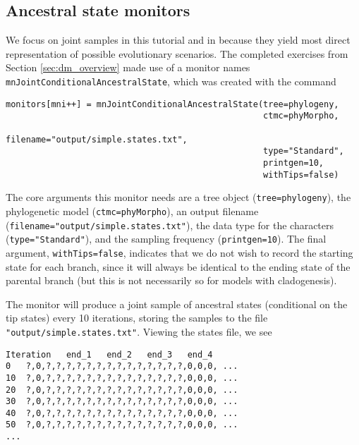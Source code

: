 \subsection{Ancestral state monitors}

We focus on joint samples in this tutorial and in \RevBayes because they yield most direct representation of possible evolutionary scenarios.
The completed exercises from Section \ref{sec:dm_overview} made use of a monitor names {\tt mnJointConditionalAncestralState}, which was created with the command

{\tt \begin{snugshade*}
\begin{lstlisting}
monitors[mni++] = mnJointConditionalAncestralState(tree=phylogeny,
                                                   ctmc=phyMorpho,
                                                   filename="output/simple.states.txt",
                                                   type="Standard",
                                                   printgen=10,
                                                   withTips=false)
\end{lstlisting}
\end{snugshade*}}

The core arguments this monitor needs are a tree object ({\tt tree=phylogeny}), the phylogenetic model ({\tt ctmc=phyMorpho}), an output filename ({\tt filename="output/simple.states.txt"}), the data type for the characters ({\tt type="Standard"}), and the sampling frequency ({\tt printgen=10}).
The final argument, {\tt withTips=false}, indicates that we do not wish to record the starting state for each branch, since it will always be identical to the ending state of the parental branch (but this is not necessarily so for models with cladogenesis).

The monitor will produce a joint sample of ancestral states (conditional on the tip states) every 10 iterations, storing the samples to the file {\tt "output/simple.states.txt"}.
Viewing the states file, we see

{\tt \begin{snugshade*}
\begin{lstlisting}
Iteration	end_1	end_2	end_3	end_4
0	?,0,?,?,?,?,?,?,?,?,?,?,?,?,?,?,0,0,0, ...
10	?,0,?,?,?,?,?,?,?,?,?,?,?,?,?,?,0,0,0, ...
20	?,0,?,?,?,?,?,?,?,?,?,?,?,?,?,?,0,0,0, ...
30	?,0,?,?,?,?,?,?,?,?,?,?,?,?,?,?,0,0,0, ...
40	?,0,?,?,?,?,?,?,?,?,?,?,?,?,?,?,0,0,0, ...
50	?,0,?,?,?,?,?,?,?,?,?,?,?,?,?,?,0,0,0, ...
...
\end{lstlisting}
\end{snugshade*}}

